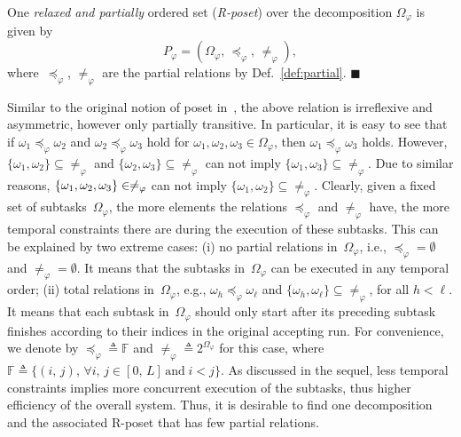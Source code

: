 \begin{definition}\label{def:poset}
One \emph{relaxed and partially} ordered set (\emph{R-poset}) over the decomposition $\Omega_{\varphi}$ is given by
\begin{equation}\label{eq:poset}
P_{\varphi} = (\Omega_{\varphi}, \, \preceq_{\varphi}, \, \neq_{\varphi}),
\end{equation}
where~$\preceq_{\varphi}$, $\neq_{\varphi}$ are the partial relations by
Def.~\ref{def:partial}.
\hfill $\blacksquare$
\end{definition}

Similar to the original notion of poset in~\citep{simovici2008mathematical},
the above relation is irreflexive and asymmetric,
however only partially transitive.
In particular, it is easy to see that
if $\omega_1\preceq_{\varphi} \omega_2$ and $\omega_2\preceq_{\varphi} \omega_3$
hold for $\omega_1,\omega_2,\omega_3\in \Omega_{\varphi}$,
then $\omega_1\preceq_{\varphi}\omega_3$ holds.
However, $\{\omega_1,\omega_2\}\subseteq\neq_{\varphi} $ and $\{\omega_2,\omega_3\}\subseteq\neq_{\varphi}$
can not imply $\{\omega_1,\omega_3\}\subseteq\neq_{\varphi}$.
Due to similar reasons, $\{\omega_1,\omega_2,\\\omega_3\}\in\neq_\varphi$ can not imply $\{\omega_1,\omega_2\}\subseteq\neq_{\varphi}$.
Clearly, given a fixed set of subtasks~$\Omega_{\varphi}$, the more elements
the relations $\preceq_{\varphi}$ and $\neq_{\varphi}$ have,
the more temporal constraints there are during the execution of these subtasks.
This can be explained by two extreme cases:
(i) no partial relations in~$\Omega_{\varphi}$, i.e.,
$\preceq_{\varphi}=\emptyset$ and $\neq_{\varphi}=\emptyset$.
It means that the subtasks in~$\Omega_{\varphi}$ can be executed in any temporal order;
(ii) total relations in~$\Omega_{\varphi}$,
e.g., $\omega_h \preceq_{\varphi} \omega_\ell$
and $\{\omega_h, \omega_\ell \}\subseteq\neq_{\varphi} $, for all $h<\ell$.
It means that each subtask in~$\Omega_{\varphi}$ should only start after
its preceding subtask finishes according to their indices in the original accepting run.
For convenience, we denote by $\preceq_{\varphi} \triangleq \mathbb{F}$
and $\neq_{\varphi} \triangleq 2^{\Omega_{\varphi}}$ for this case,
where $\mathbb{F}\triangleq \{(i,\, j),\, \forall i,\,j\in [0,\, L] \,\text{and}\; i<j\}$.
As discussed in the sequel,
less temporal constraints implies more concurrent execution of the subtasks,
thus higher efficiency of the overall system.
Thus, it is desirable to find one decomposition and the associated R-poset
that has few partial relations.


